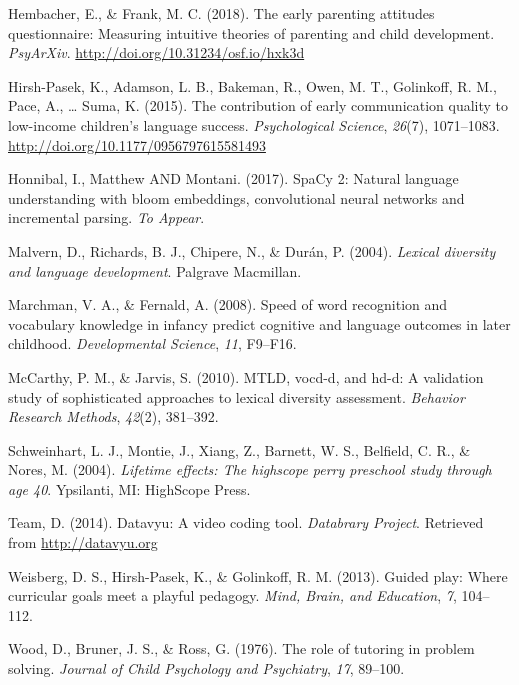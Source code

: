 \documentclass[man,floatsintext]{apa6}
\begin{document}
\leavevmode\hypertarget{ref-Hembacher2018}{}%
Hembacher, E., \& Frank, M. C. (2018). The early parenting attitudes questionnaire: Measuring intuitive theories of parenting and child development. \emph{PsyArXiv}. \url{http://doi.org/10.31234/osf.io/hxk3d}

\leavevmode\hypertarget{ref-HirshPasek2015}{}%
Hirsh-Pasek, K., Adamson, L. B., Bakeman, R., Owen, M. T., Golinkoff, R. M., Pace, A., \ldots{} Suma, K. (2015). The contribution of early communication quality to low-income children's language success. \emph{Psychological Science}, \emph{26}(7), 1071--1083. \url{http://doi.org/10.1177/0956797615581493}

\leavevmode\hypertarget{ref-spacy2}{}%
Honnibal, I., Matthew AND Montani. (2017). SpaCy 2: Natural language understanding with bloom embeddings, convolutional neural networks and incremental parsing. \emph{To Appear}.

\leavevmode\hypertarget{ref-Malvern2004}{}%
Malvern, D., Richards, B. J., Chipere, N., \& Durán, P. (2004). \emph{Lexical diversity and language development}. Palgrave Macmillan.

\leavevmode\hypertarget{ref-Marchman2008}{}%
Marchman, V. A., \& Fernald, A. (2008). Speed of word recognition and vocabulary knowledge in infancy predict cognitive and language outcomes in later childhood. \emph{Developmental Science}, \emph{11}, F9--F16.

\leavevmode\hypertarget{ref-McCarthy2010}{}%
McCarthy, P. M., \& Jarvis, S. (2010). MTLD, vocd-d, and hd-d: A validation study of sophisticated approaches to lexical diversity assessment. \emph{Behavior Research Methods}, \emph{42}(2), 381--392.

\leavevmode\hypertarget{ref-PerryPreschool2004}{}%
Schweinhart, L. J., Montie, J., Xiang, Z., Barnett, W. S., Belfield, C. R., \& Nores, M. (2004). \emph{Lifetime effects: The highscope perry preschool study through age 40}. Ypsilanti, MI: HighScope Press.

\leavevmode\hypertarget{ref-datavyu}{}%
Team, D. (2014). Datavyu: A video coding tool. \emph{Databrary Project}. Retrieved from \url{http://datavyu.org}

\leavevmode\hypertarget{ref-Weisberg2013}{}%
Weisberg, D. S., Hirsh-Pasek, K., \& Golinkoff, R. M. (2013). Guided play: Where curricular goals meet a playful pedagogy. \emph{Mind, Brain, and Education}, \emph{7}, 104--112.

\leavevmode\hypertarget{ref-Wood1976}{}%
Wood, D., Bruner, J. S., \& Ross, G. (1976). The role of tutoring in problem solving. \emph{Journal of Child Psychology and Psychiatry}, \emph{17}, 89--100.
\end{document}
